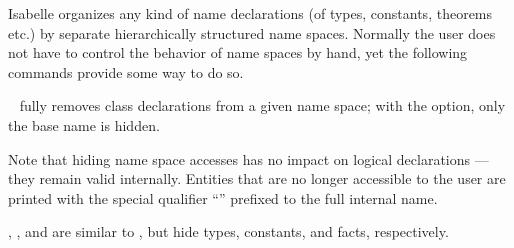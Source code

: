 \begin{isabellebody}
\begin{isamarkuptext}
  Isabelle organizes any kind of name declarations (of types,
  constants, theorems etc.) by separate hierarchically structured name
  spaces.  Normally the user does not have to control the behavior of
  name spaces by hand, yet the following commands provide some way to
  do so.

  \begin{description}

  \item \hyperlink{command.hide-class}{\mbox{}}~ fully removes class
  declarations from a given name space; with the 
  option, only the base name is hidden.

  Note that hiding name space accesses has no impact on logical
  declarations --- they remain valid internally.  Entities that are no
  longer accessible to the user are printed with the special qualifier
  ``'' prefixed to the full internal name.

  \item \hyperlink{command.hide-type}{\mbox{}}, \hyperlink{command.hide-const}{\mbox{}}, and \hyperlink{command.hide-fact}{\mbox{}} are similar to \hyperlink{command.hide-class}{\mbox{}}, but hide types,
  constants, and facts, respectively.
  
  \end{description}%
\end{isamarkuptext}%
\isamarkuptrue%
%
\isadelimtheory
%
\endisadelimtheory
%
\isatagtheory
{}\isamarkupfalse%
%
\endisatagtheory
{\isafoldtheory}%
%
\isadelimtheory
%
\endisadelimtheory
\isanewline
\end{isabellebody}%
